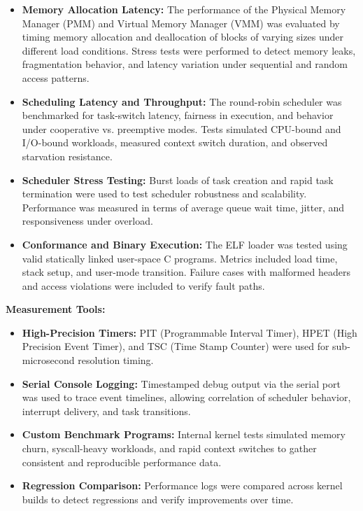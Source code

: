 \documentclass[12pt]{extarticle}
\begin{document}
\begin{itemize}
    \item \textbf{Memory Allocation Latency:} The performance of the Physical Memory Manager (PMM) and Virtual Memory Manager (VMM) was evaluated by timing memory allocation and deallocation of blocks of varying sizes under different load conditions. Stress tests were performed to detect memory leaks, fragmentation behavior, and latency variation under sequential and random access patterns.

    \item \textbf{Scheduling Latency and Throughput:} The round-robin scheduler was benchmarked for task-switch latency, fairness in execution, and behavior under cooperative vs. preemptive modes. Tests simulated CPU-bound and I/O-bound workloads, measured context switch duration, and observed starvation resistance.

    \item \textbf{Scheduler Stress Testing:} Burst loads of task creation and rapid task termination were used to test scheduler robustness and scalability. Performance was measured in terms of average queue wait time, jitter, and responsiveness under overload.

    \item \textbf{Conformance and Binary Execution:} The ELF loader was tested using valid statically linked user-space C programs. Metrics included load time, stack setup, and user-mode transition. Failure cases with malformed headers and access violations were included to verify fault paths.
\end{itemize}

\noindent\textbf{Measurement Tools:}
\begin{itemize}
    \item \textbf{High-Precision Timers:} PIT (Programmable Interval Timer), HPET (High Precision Event Timer), and TSC (Time Stamp Counter) were used for sub-microsecond resolution timing.

    \item \textbf{Serial Console Logging:} Timestamped debug output via the serial port was used to trace event timelines, allowing correlation of scheduler behavior, interrupt delivery, and task transitions.

    \item \textbf{Custom Benchmark Programs:} Internal kernel tests simulated memory churn, syscall-heavy workloads, and rapid context switches to gather consistent and reproducible performance data.

    \item \textbf{Regression Comparison:} Performance logs were compared across kernel builds to detect regressions and verify improvements over time.
\end{itemize}
\end{document}
